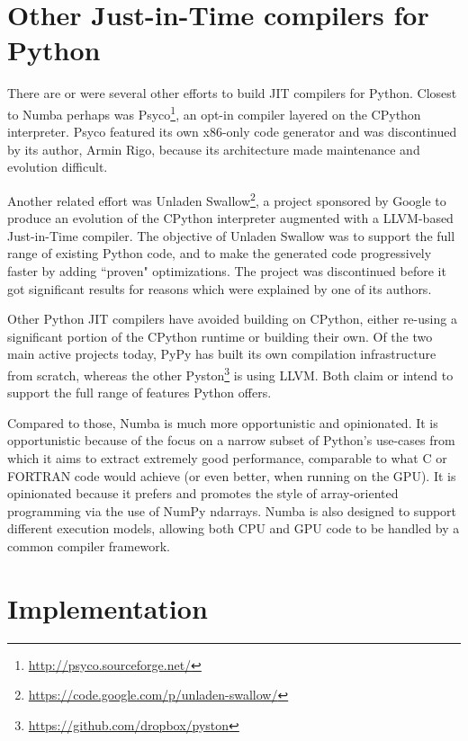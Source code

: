 \documentclass{sig-alternate}
\begin{document}
\section{Other Just-in-Time compilers for Python}

There are or were several other efforts to build JIT compilers for
Python.  Closest to Numba perhaps was
Psyco\footnote{\url{http://psyco.sourceforge.net/}}, an opt-in
compiler layered on the CPython interpreter.  Psyco featured its own
x86-only code generator and was discontinued by its author, Armin
Rigo, because its architecture made maintenance and evolution
difficult. \cite{rigo2004representation}

Another related effort was
Unladen Swallow\footnote{\url{https://code.google.com/p/unladen-swallow/}},
a project sponsored by Google to produce an evolution of the CPython interpreter
augmented with a LLVM-based Just-in-Time compiler.
The objective of Unladen Swallow was to support the full range of existing
Python code, and to make the generated code progressively faster by adding
``proven" optimizations.  The project was discontinued before it got
significant results for reasons which were explained by one of its authors.
\cite{kleckner:unladen_swallow_post_mortem}

Other Python JIT compilers have avoided building on CPython, either
re-using a significant portion of the CPython runtime or building
their own.  Of the two main active projects today, PyPy
\cite{pypy:pypy} has built its own compilation infrastructure from
scratch, whereas the other
Pyston\footnote{\url{https://github.com/dropbox/pyston}} is using
LLVM.  Both claim or intend to support the full range of features
Python offers.

Compared to those, Numba is much more opportunistic and opinionated.
It is opportunistic because of the focus on a narrow subset of Python's use-cases
from which it aims to extract extremely good performance, comparable to what C
or FORTRAN code would achieve (or even better, when running on the GPU).
It is opinionated because it prefers and promotes the style of array-oriented
programming via the use of NumPy ndarrays.
Numba is also designed to support different execution models, allowing both
CPU and GPU code to be handled by a common compiler framework.


\section{Implementation}
\end{document}
